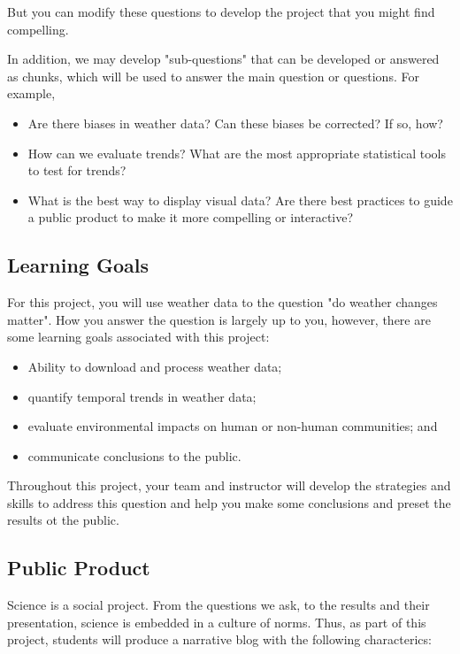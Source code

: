 \documentclass{article}\usepackage[]{graphicx}\usepackage[]{color}
\begin{document}
But you can modify these questions to develop the project that you might find compelling.

In addition, we may develop "sub-questions" that can be developed or answered as chunks, which will be used to answer the main question or questions. For example, 

\begin{itemize}
  \item Are there biases in weather data? Can these biases be corrected? If so, how?
  \item How can we evaluate trends? What are the most appropriate statistical tools to test for trends?
  \item What is the best way to display visual data?  Are there best practices to guide a public product to make it more compelling or interactive?
\end{itemize}

\subsection{Learning Goals}

For this project, you will use weather data to the question "do weather changes matter". How you answer the question is largely up to you, however, there are some learning goals associated with this project:

\begin{itemize}
  \item Ability to download and process weather data;
  \item quantify temporal trends in weather data;
  \item evaluate environmental impacts on human or non-human communities; and
  \item communicate conclusions to the public.
\end{itemize}

Throughout this project, your team and instructor will develop the strategies and skills to address this question and help you make some conclusions and preset the results ot the public.

\subsection{Public Product}

Science is a social project. From the questions we ask, to the results and their presentation, science is embedded in a culture of norms. Thus, as part of this project, students will produce a narrative blog with the following characterics:
\end{document}
